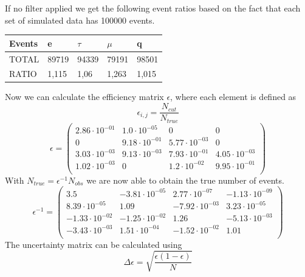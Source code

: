 \documentclass[]{article}
\begin{document}
If no filter applied we get the following event ratios based on the fact that each set of simulated data has 100000 events. 
\newline
\newline
\begin{tabular}{ |p{3cm}||p{2cm}|p{2cm}|p{2cm}|p{2cm}|  }
 \hline
 Events & e & $\tau$ & $\mu$ & q \\
 \hline
 \hline
  TOTAL & 89719 & 94339 & 79191 & 98501 \\
  \hline
  RATIO & 1,115 & 1,06 & 1,263 & 1,015 \\
 \hline
\end{tabular}
\newline
\newline
Now we can calculate the efficiency matrix $\epsilon$, where each element is defined as 
\begin{equation}
\epsilon_{i,j} = \frac{N_{cut}}{N_{true}}
\end{equation}
\begin{equation}
\epsilon=\begin{pmatrix}
   2.86\cdot 10^{-01} & 1.0\cdot 10^{-05} & 0 & 0 \\
   0 & 9.18\cdot 10^{-01} & 5.77\cdot 10^{-03} & 0 \\
   3.03\cdot 10^{-03} & 9.13\cdot 10^{-03} & 7.93\cdot 10^{-01} & 4.05\cdot 10^{-03} \\
   1.02\cdot 10^{-03} & 0 & 1.2\cdot 10^{-02} & 9.95\cdot 10^{-01} \\
\end{pmatrix}
\end{equation}
With $N_{true} = \epsilon^{-1} N_{obs}$ we are now able to obtain the true number of events.
\begin{equation}
\epsilon^{-1}=\begin{pmatrix}
   3.5 & -3.81\cdot 10^{-05} & 2.77\cdot 10^{-07} & -1.13\cdot 10^{-09} \\
   8.39\cdot 10^{-05} & 1.09 & -7.92\cdot 10^{-03} & 3.23\cdot 10^{-05} \\
   -1.33\cdot 10^{-02} & -1.25\cdot 10^{-02} & 1.26 & -5.13\cdot 10^{-03} \\
   -3.43\cdot 10^{-03} & 1.51\cdot 10^{-04} & -1.52\cdot 10^{-02} & 1.01 \\
\end{pmatrix}
\end{equation}
The uncertainty matrix can be calculated using
\begin{equation}
\Delta \epsilon = \sqrt{\frac{\epsilon(1-\epsilon)}{N}}
\end{equation}
\end{document}
